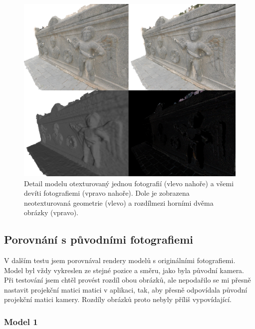 \documentclass[11pt,twoside,a4paper]{book}
\begin{document}
\begin{figure}[h!]
\begin{center}
\includegraphics[width=\textwidth]{figures/test-5}
\caption{Detail modelu otexturovaný jednou fotografií (vlevo nahoře) a všemi devíti fotografiemi (vpravo nahoře). Dole je zobrazena neotexturovaná geometrie (vlevo) a rozdíl\protect\footnotemark mezi horními dvěma obrázky (vpravo).}
\label{fig:test-5}
\end{center}
\end{figure}

\subsection{Porovnání s původními fotografiemi}

V dalším testu jsem porovnával rendery modelů s originálními fotografiemi. Model byl vždy vykreslen ze stejné pozice a směru, jako byla původní kamera. Při testování jsem chtěl provést rozdíl obou obrázků, ale nepodařilo se mi přesně nastavit projekční matici matici v aplikaci, tak, aby přesně odpovídala původní projekční matici kamery. Rozdíly obrázků proto nebyly příliš vypovídající.

\subsubsection*{Model 1}
\end{document}
